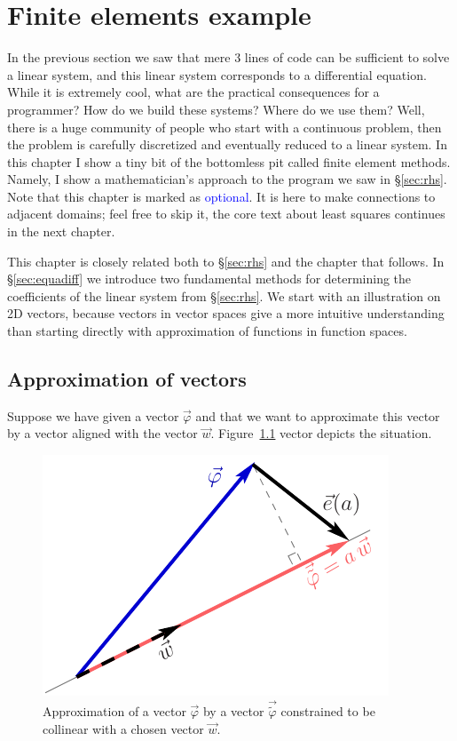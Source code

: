 \documentclass[notitlepage,oneside]{book}
\makeatletter
\newcommand{\authoredby}[1]{\addtocontents{toc}{\protect\@nameuse{authoredby#1}}}%
\makeatother
\begin{document}
\authoredby{A}
\chapter{Finite elements example}
\fancyhead[R]{\textcolor{blue}{optional reading}}

In the previous section we saw that mere 3 lines of code can be sufficient to solve a linear system, and this linear system corresponds to a differential equation.
While it is extremely cool, what are the practical consequences for a programmer?  How do we build these systems? Where do we use them?
Well, there is a huge community of people who start with a continuous problem, then the problem is carefully discretized and eventually reduced to a linear system.
In this chapter I show a tiny bit of the bottomless pit called finite element methods.
Namely, I show a mathematician's approach to the program we saw in \S\ref{sec:rhs}.
Note that this chapter is marked as \textcolor{blue}{optional}.
It is here to make connections to adjacent domains; feel free to skip it, the core text about least squares continues in the next chapter.

This chapter is closely related both to \S\ref{sec:rhs} and the chapter that follows.
In \S\ref{sec:equadiff} we introduce two fundamental methods for determining the coefficients of the linear system from \S\ref{sec:rhs}.
We start with an illustration on 2D vectors, because vectors in vector spaces give a more intuitive understanding than starting directly with approximation of functions in function spaces.

\section{Approximation of vectors}

Suppose we have given a vector $\vec{\varphi}$ and that we want to approximate this vector by a vector aligned with the vector $\vec{w}$.
Figure~\ref{fig:vector_approximation} vector depicts the situation.

\begin{figure}[ht]
	\centering
	\includegraphics[width=.4\linewidth]{img/vector_approximation.pdf}
	\caption{Approximation of a vector $\vec{\varphi}$ by a vector $\vec{\tilde{\varphi}}$ constrained to be collinear with a chosen vector $\vec{w}$.}
	\label{fig:vector_approximation}
\end{figure}
\end{document}
